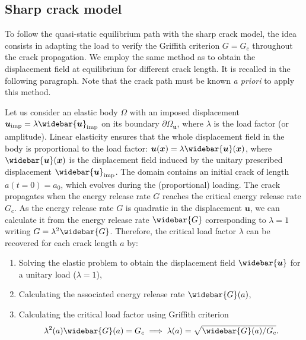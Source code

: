 \documentclass[OptSoft]{jtcam_preprint}
\newcommand{\xx}{\bm{x}}
\newcommand{\uu}{\bm{u}}
\newcommand{\uimp}{\uu_{\mathrm{imp}}}
\newcommand{\uimpbar}{\widebar{\uu}_{\mathrm{imp}}}
\begin{document}
\subsection{Sharp crack model}
\label{sub:equilibrium_path_lefm}

To follow the quasi-static equilibrium path with the sharp crack model, the idea consists in adapting the load to verify the Griffith criterion $G = G_c$ throughout the crack propagation.
We employ the same method as \textcite{triclot_toughening_2024} to obtain the displacement field at equilibrium for different crack length.
It is recalled in the following paragraph.
Note that the crack path must be known \emph{a priori} to apply this method.

Let us consider an elastic body $\Omega$ with an imposed displacement $\uimp = \lambda \uimpbar$ on its boundary $\partial \Omega_{\uu}$, where $\lambda$ is the load factor (or amplitude).
Linear elasticity ensures that the whole displacement field in the body is proportional to the load factor: $\uu(\xx) = \lambda \widebar{\uu}(\xx)$, where $\widebar{\uu}(\xx)$ is the displacement field induced by the unitary prescribed displacement $\uimpbar$.
The domain contains an initial crack of length $a(t=0) = a_0$, which evolves during the (proportional) loading.
The crack propagates when the energy release rate $G$ reaches the critical energy release rate $G_c$.
As the energy release rate $G$ is quadratic in the displacement $\uu$, we can calculate it from the energy release rate $\widebar{G}$ corresponding to $\lambda = 1$ writing $G = \lambda^2 \widebar{G}$.
Therefore, the critical load factor $\lambda$ can be recovered for each crack length $a$ by:
\begin{enumerate}
  \item Solving the elastic problem to obtain the displacement field $\widebar{\uu}$ for a unitary load ($\lambda = 1$),
  \item Calculating the associated energy release rate $\widebar{G}(a)$,
  \item Calculating the critical load factor using Griffith criterion
    \begin{equation}
      \lambda^2(a) \widebar{G}(a) = G_c \implies \lambda(a) = \sqrt{\widebar{G}(a) / G_c}.
    \end{equation}
\end{enumerate}
\end{document}
